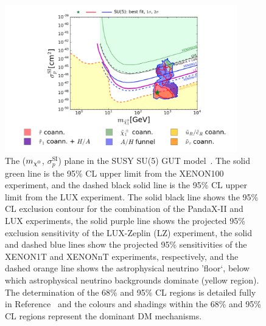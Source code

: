 \begin{figure}
\centering
    \includegraphics[width=0.9\textwidth]{./Figures/conclusions/mastercode}
  \caption{
The ($m_{\chi^{0}}$, $\sigma_p^{\text{SI}}$) plane in the SUSY SU(5) GUT model~\cite{mastercode}.
The solid green line is the 95\% CL upper limit from the XENON100 experiment, 
and the dashed black solid line is the 95\% CL upper limit from the LUX experiment. 
The solid black line shows the 95\% CL exclusion contour for the combination 
of the PandaX-II and LUX experiments, the solid purple line shows the projected 95\% 
exclusion sensitivity of the LUX-Zeplin (LZ) experiment, the solid and dashed blue 
lines show the projected 95\% sensitivities of the XENON1T and XENONnT experiments,
respectively, and the dashed orange line shows the astrophysical neutrino 'floor`, 
below which astrophysical neutrino backgrounds dominate (yellow region). 
The determination of the 68\% and 95\% CL regions is detailed fully in Reference~\cite{mastercode}
and the colours and shadings within the 68\% and 95\% CL regions represent the dominant
DM mechanisms.}
  \label{fig:mastercode}
\end{figure}
